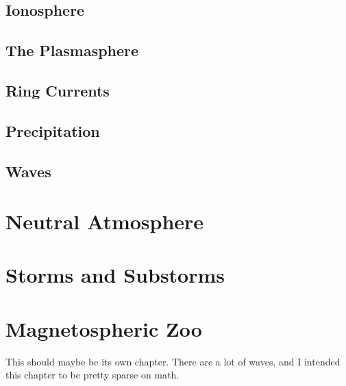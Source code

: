 \subsection{Ionosphere}

\subsection{The Plasmasphere}

\subsection{Ring Currents}

\subsection{Precipitation}

\subsection{\Alfven Waves}


\section{Neutral Atmosphere}

\section{Storms and Substorms}


\section{Magnetospheric Zoo}

This should maybe be its own chapter. There are a lot of waves, and I intended this chapter to be pretty sparse on math. 










